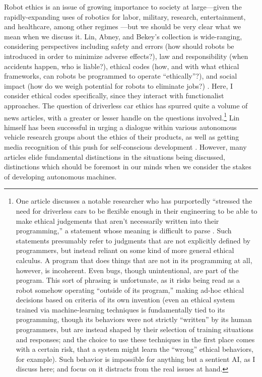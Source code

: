 Robot ethics is an issue of growing importance to society at
large---given the rapidly-expanding uses of robotics for labor, military,
research, entertainment, and healthcare, among other regimes \cite[p.
  5-6]{patrickLin}---but we should be very clear what we mean when we
discuss it. Lin, Abney, and Bekey's collection is wide-ranging,
considering perspectives including safety and errors (how should
robots be introduced in order to minimize adverse effects?), law and
responsibility (when accidents happen, who is liable?), ethical codes
(how, and with what ethical frameworks, can robots be programmed to
operate ``ethically''?), and social impact
(how do we weigh potential for robots to eliminate
jobs?) \cite{robotEthics}. Here, I consider ethical codes specifically,
since they interact with functionalist approaches. The question of
driverless car ethics has spurred quite a volume of news articles,
with a greater or lesser handle on the questions
involved.\footnote{One article discusses a notable
  researcher who has purportedly ``stressed the need for driverless
  cars to be flexible enough in their 
engineering to be able to make ethical judgements that aren't
necessarily written into their programming,'' a statement whose
meaning is difficult to parse \cite{jessicaDavies}. Such statements
presumably 
refer to judgments that are not explicitly defined by programmers, but
instead reliant on some kind of more general ethical calculus. A
program that does things that are not in its programming at all,
however, is incoherent. Even bugs, though unintentional, are part of
the program. This sort of phrasing is unfortunate, as it
risks being read as a robot somehow operating ``outside of its
program,'' making ad-hoc ethical decisions based on criteria of its
own invention (even an ethical system trained via machine-learning
techniques is fundamentally tied to its programming, though its
behaviors were not strictly ``written'' by its human programmers, but
are instead shaped by their selection of training situations and
responses; and the choice to use these techniques in the first place
comes with a certain risk, that a system
might learn the ``wrong'' ethical behaviors, for example). Such
behavior is impossible for anything but a sentient
AI, as I discuss here; and focus on it distracts from the real issues
at hand.} Lin himself has been successful in urging a dialogue
within various autonomous vehicle research groups about the ethics of
their products, as well as getting media recognition of this push for
self-conscious development \cite{timeEthics}. However, many articles
elide fundamental distinctions in the situations being discussed,
distinctions which should be foremost in our minds when we consider
the stakes of developing autonomous machines.

